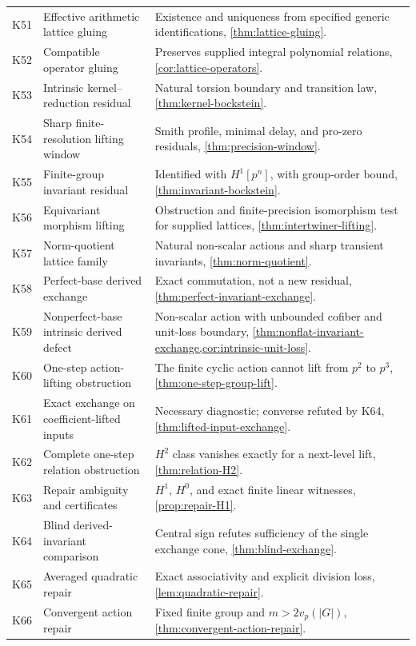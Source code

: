 \documentclass[11pt]{article}
\theoremstyle{definition}
\theoremstyle{remark}
\begin{document}
\begin{longtable}{>{\raggedright\arraybackslash}p{} >{\raggedright\arraybackslash}p{} >{\raggedright\arraybackslash}p{}}
K51 & Effective arithmetic lattice gluing & Existence and uniqueness from specified generic identifications, \cref{thm:lattice-gluing}.\\
K52 & Compatible operator gluing & Preserves supplied integral polynomial relations, \cref{cor:lattice-operators}.\\
K53 & Intrinsic kernel--reduction residual & Natural torsion boundary and transition law, \cref{thm:kernel-bockstein}.\\
K54 & Sharp finite-resolution lifting window & Smith profile, minimal delay, and pro-zero residuals, \cref{thm:precision-window}.\\
K55 & Finite-group invariant residual & Identified with $H^1[p^n]$, with group-order bound, \cref{thm:invariant-bockstein}.\\
K56 & Equivariant morphism lifting & Obstruction and finite-precision isomorphism test for supplied lattices, \cref{thm:intertwiner-lifting}.\\
K57 & Norm-quotient lattice family & Natural non-scalar actions and sharp transient invariants, \cref{thm:norm-quotient}.\\
K58 & Perfect-base derived exchange & Exact commutation, not a new residual, \cref{thm:perfect-invariant-exchange}.\\
K59 & Nonperfect-base intrinsic derived defect & Non-scalar action with unbounded cofiber and unit-loss boundary, \cref{thm:nonflat-invariant-exchange,cor:intrinsic-unit-loss}.\\
K60 & One-step action-lifting obstruction & The finite cyclic action cannot lift from $p^2$ to $p^3$, \cref{thm:one-step-group-lift}.\\
K61 & Exact exchange on coefficient-lifted inputs & Necessary diagnostic; converse refuted by K64, \cref{thm:lifted-input-exchange}.\\
K62 & Complete one-step relation obstruction & $H^2$ class vanishes exactly for a next-level lift, \cref{thm:relation-H2}.\\
K63 & Repair ambiguity and certificates & $H^1$, $H^0$, and exact finite linear witnesses, \cref{prop:repair-H1}.\\
K64 & Blind derived-invariant comparison & Central sign refutes sufficiency of the single exchange cone, \cref{thm:blind-exchange}.\\
K65 & Averaged quadratic repair & Exact associativity and explicit division loss, \cref{lem:quadratic-repair}.\\
K66 & Convergent action repair & Fixed finite group and $m>2v_p(|G|)$, \cref{thm:convergent-action-repair}.\\

\end{longtable}
\end{document}

